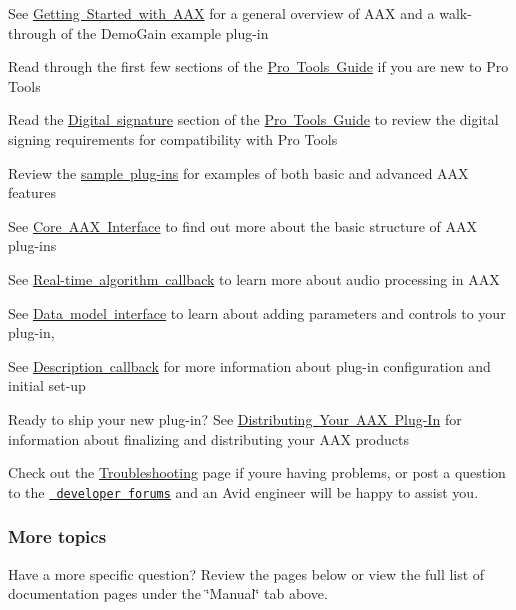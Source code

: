 \begin{DoxyItemize}
\item See \mbox{\hyperlink{a00794}{Getting Started with A\+AX}} for a general overview of A\+AX and a walk-\/through of the Demo\+Gain example plug-\/in \item Read through the first few sections of the \mbox{\hyperlink{a00830}{Pro Tools Guide}} if you are new to Pro Tools \item Read the \mbox{\hyperlink{a00830_subsection__digital_signature_}{Digital signature}} section of the \mbox{\hyperlink{a00830}{Pro Tools Guide}} to review the digital signing requirements for compatibility with Pro Tools \item Review the \mbox{\hyperlink{a00848}{sample plug-\/ins}} for examples of both basic and advanced A\+AX features \item See \mbox{\hyperlink{a00795}{Core A\+AX Interface}} to find out more about the basic structure of A\+AX plug-\/ins \item See \mbox{\hyperlink{a00797}{Real-\/time algorithm callback}} to learn more about audio processing in A\+AX \item See \mbox{\hyperlink{a00798}{Data model interface}} to learn about adding parameters and controls to your plug-\/in, \item See \mbox{\hyperlink{a00796}{Description callback}} for more information about plug-\/in configuration and initial set-\/up \item Ready to ship your new plug-\/in? See \mbox{\hyperlink{a00843}{Distributing Your A\+AX Plug-\/\+In}} for information about finalizing and distributing your A\+AX products \item Check out the \mbox{\hyperlink{a00842}{Troubleshooting}} page if you\textquotesingle{}re having problems, or post a question to the \href{https://dev.avid.com}{\texttt{ developer forums}} and an Avid engineer will be happy to assist you.\end{DoxyItemize}
\hypertarget{a00793_welcome_more}{}\subsubsection{More topics}\label{a00793_welcome_more}
Have a more specific question? Review the pages below or view the full list of documentation pages under the \char`\"{}\+Manual\char`\"{} tab above.

